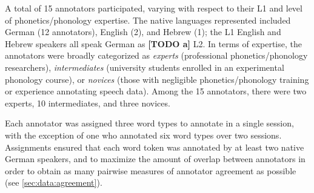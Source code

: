 \documentclass[a4paper]{article}
\newcommand{\TODO}[1]{{\color{red}\textbf{[TODO #1]}}}
\begin{document}
		A total of 15 annotators participated, varying with respect to their L1 and level of phonetics/phonology expertise. 
		The native languages represented included German (12 annotators), English (2), and Hebrew (1); the L1 English and Hebrew speakers all speak German as \TODO{a} L2. 
		In terms of expertise, the annotators were broadly categorized as \textit{experts} (professional phonetics/phonology researchers), \textit{intermediates} (university students enrolled in an experimental phonology course), or \textit{novices} (those with negligible phonetics/phonology training or experience annotating speech data). Among the 15 annotators, there were two experts, 10 intermediates, and three novices. 		


		
		
		Each annotator was assigned three word types to annotate in a single session, with the exception of one who annotated six word types over two sessions. 
		Assignments ensured that each word token was annotated by at least two native German speakers, and to maximize the amount of overlap between annotators in order to obtain as many pairwise measures of annotator agreement as possible 
		(see \cref{sec:data:agreement}).
		
\end{document}
